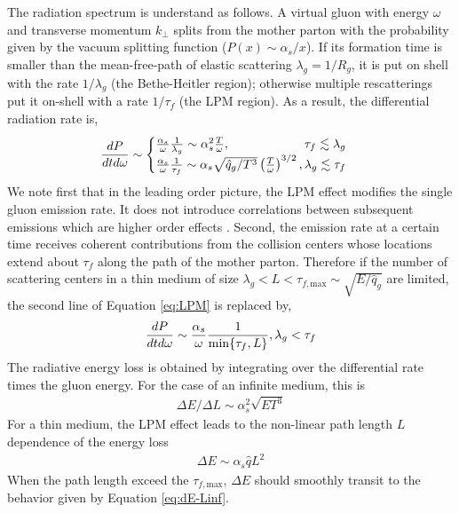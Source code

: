 \documentclass[aps, prc, reprint, amsmath, groupedaddress, nofootinbib]{revtex4-1}
\begin{document}
The radiation spectrum is understand as follows. 
A virtual gluon with energy $\omega$ and transverse momentum $k_\perp$ splits from the mother parton with the probability given by the vacuum splitting function ($P(x) \sim \alpha_s/x$).
If its formation time is smaller than the mean-free-path of elastic scattering $\lambda_g = 1/R_g$, it is put on shell with the rate $1/\lambda_g$ (the Bethe-Heitler region); otherwise multiple rescatterings put it on-shell with a rate $1/\tau_f$ (the LPM region).
As a result, the differential radiation rate is,
\begin{eqnarray}\label{eq:LPM}
\frac{dP}{dt d\omega} \sim \begin{cases}
 \frac{\alpha_s}{\omega} \frac{1}{\lambda_g} \sim \alpha_s^2  \frac{T}{\omega}, \hfill \tau_f \lesssim \lambda_g\\
 \frac{\alpha_s}{\omega} \frac{1}{\tau_f}\sim \alpha_s \sqrt{\hat{q}_g/T^3} \left(\frac{T}{\omega}\right)^{3/2}, \hfill \lambda_g \lesssim \tau_f
\end{cases}
\end{eqnarray}
We note first that in the leading order picture, the LPM effect modifies the single gluon emission rate. 
It does not introduce correlations between subsequent emissions which are higher order effects \cite{Arnold:2016jnq}.
Second, the emission rate at a certain time receives coherent contributions from the collision centers whose locations extend about $\tau_f$ along the path of the mother parton.
Therefore if the number of scattering centers in a thin medium of size $\lambda_g < L< \tau_{f,\textrm{max}} \sim \sqrt{E/\hat{q}_g}$ are limited, the second line of Equation \ref{eq:LPM} is replaced by,
\begin{eqnarray}
\frac{dP}{dt d\omega} \sim 
 \frac{\alpha_s}{\omega} \frac{1}{\min\{\tau_f,L\}}, \hfill \lambda_g < \tau_f
\end{eqnarray}
The radiative energy loss is obtained by integrating over the differential rate times the gluon energy. 
For the case of an infinite medium, this is
\begin{eqnarray}\label{eq:dE-Linf}
\Delta E/\Delta L \sim \alpha_s^2 \sqrt{ET^3}
\end{eqnarray}
For a thin medium, the LPM effect leads to the non-linear path length $L$ dependence of the energy loss
\begin{eqnarray}\label{eq:dE-Lfinite}
\Delta E \sim \alpha_s \hat{q} L^2
\end{eqnarray}
When the path length exceed the $\tau_{f,\textrm{max}}$, $\Delta E$ should smoothly transit to the behavior given by Equation \ref{eq:dE-Linf}.
\end{document}
